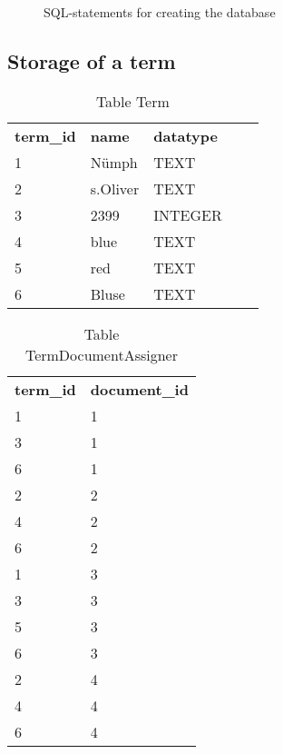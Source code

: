 \begin{figure}[h]
    
    \caption{SQL-statements for creating the database}
\end{figure}

\subsection{Storage of a term}

\begin{table}[h]
    \begin{center}
        \begin{tabular}{ l l l l l }
            \rowcolor{Gray}
            \textbf{term\_id}   & \textbf{name} & \textbf{datatype}\\
            1                   & N\"umph       & TEXT\\
            2                   & s.Oliver      & TEXT\\
            3                   & 2399          & INTEGER\\
            4                   & blue          & TEXT\\
            5                   & red           & TEXT\\
            6                   & Bluse         & TEXT\\
        \end{tabular}
        \caption{Table Term}
    \end{center}
\end{table}

\begin{table}[h]
    \begin{center}
        \begin{tabular}{ l l }
            \rowcolor{Gray}
            \textbf{term\_id}   & \textbf{document\_id}\\
            1                   & 1\\
            3                   & 1\\
            6                   & 1\\
            2                   & 2\\
            4                   & 2\\
            6                   & 2\\
            1                   & 3\\
            3                   & 3\\
            5                   & 3\\
            6                   & 3\\
            2                   & 4\\
            4                   & 4\\
            6                   & 4\\
        \end{tabular}
        \caption{Table TermDocumentAssigner}
    \end{center}
\end{table}


